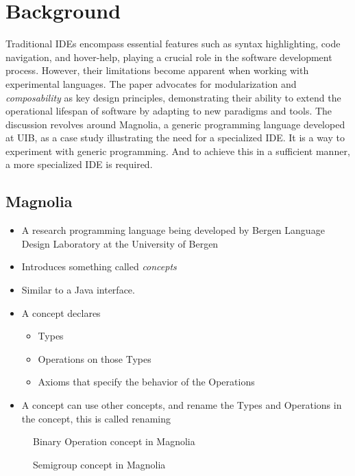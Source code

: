 \chapter{Background}

Traditional IDEs encompass essential features such as syntax highlighting, code
navigation, and hover-help, playing a crucial role in the software development
process. However, their limitations become apparent when working with
experimental languages. The paper advocates for modularization and \textit{composability}
as key design principles, demonstrating their ability to extend the operational
lifespan of software by adapting to new paradigms and tools. The discussion
revolves around Magnolia, a generic programming language developed at UIB, as a
case study illustrating the need for a specialized IDE. It is a way to experiment
with generic programming. And to achieve this in a sufficient manner, a more
specialized IDE is required.

\section{Magnolia}

\begin{itemize}
  \item A research programming language being developed by
    Bergen Language Design Laboratory at the University of Bergen
  \item Introduces something called \textit{concepts}
  \item Similar to a Java interface.
  \item A concept declares
    \begin{itemize}
      \item Types
      \item Operations on those Types
      \item Axioms that specify the behavior of the Operations
    \end{itemize}
  \item A concept can use other concepts, and rename the Types and Operations
    in the concept, this is called renaming
\end{itemize}

\begin{figure}
  \centering
  
  \caption{Binary Operation concept in Magnolia}
\end{figure}

\begin{figure}
  \centering
  
  \caption{Semigroup concept in Magnolia}
\end{figure}


